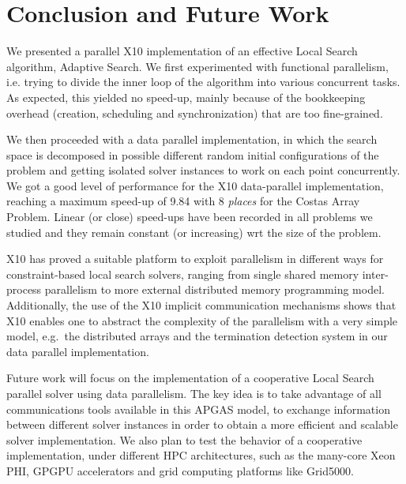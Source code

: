 \documentclass{llncs}
\begin{document}
\section{Conclusion and Future Work}

We presented a parallel X10 implementation of an effective Local
Search algorithm, Adaptive Search.  We first experimented with
functional parallelism, i.e. trying to divide the inner loop of the
algorithm into various concurrent tasks.  As expected, this yielded no
speed-up, mainly because of the bookkeeping overhead (creation,
scheduling and synchronization) that are too fine-grained.

We then proceeded with a data parallel implementation, in which the
search space is decomposed in possible different random initial
configurations of the problem and getting isolated solver instances to
work on each point concurrently.  We got a good level of performance
for the X10 data-parallel implementation, reaching a maximum speed-up
of 9.84 with 8 \emph{places} for the Costas Array Problem.  Linear (or
close) speed-ups have been recorded in all problems we studied and
they remain constant (or increasing) wrt the size of the problem.

X10 has proved a suitable platform to exploit parallelism in different
ways for constraint-based local search solvers, ranging from single
shared memory inter-process parallelism to more external distributed
memory programming model.  Additionally, the use of the X10 implicit
communication mechanisms shows that X10 enables one to abstract the
complexity of the parallelism with a very simple model, e.g.~the
distributed arrays and the termination detection system in our data
parallel implementation.



Future work will focus on the implementation of a cooperative Local
Search parallel solver using data parallelism.  The key idea is to
take advantage of all communications tools available in this APGAS
model, to exchange information between different solver instances in
order to obtain a more efficient and scalable solver implementation.
We also plan to test the behavior of a cooperative implementation,
under different HPC architectures, such as the many-core Xeon PHI,
GPGPU accelerators and grid computing platforms like Grid5000.

 


\end{document}
